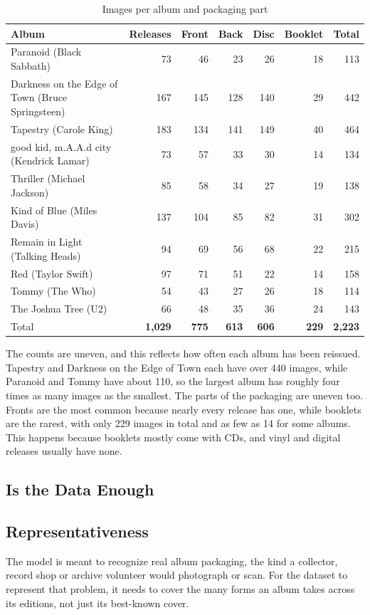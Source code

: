 \documentclass[10pt,a4paper,twocolumn]{article}
\begin{document}
\begin{table}[!t]\centering\small\caption{Images per album and packaging part}\label{tab:counts}
\begin{tabularx}{\linewidth}{@{}Xrrrrrr@{}}\toprule
Album & Releases & Front & Back & Disc & Booklet & Total\\\midrule
Paranoid (Black Sabbath) & 73 & 46 & 23 & 26 & 18 & 113\\
Darkness on the Edge of Town (Bruce Springsteen) & 167 & 145 & 128 & 140 & 29 & 442\\
Tapestry (Carole King) & 183 & 134 & 141 & 149 & 40 & 464\\
good kid, m.A.A.d city (Kendrick Lamar) & 73 & 57 & 33 & 30 & 14 & 134\\
Thriller (Michael Jackson) & 85 & 58 & 34 & 27 & 19 & 138\\
Kind of Blue (Miles Davis) & 137 & 104 & 85 & 82 & 31 & 302\\
Remain in Light (Talking Heads) & 94 & 69 & 56 & 68 & 22 & 215\\
Red (Taylor Swift) & 97 & 71 & 51 & 22 & 14 & 158\\
Tommy (The Who) & 54 & 43 & 27 & 26 & 18 & 114\\
The Joshua Tree (U2) & 66 & 48 & 35 & 36 & 24 & 143\\\midrule
Total & \textbf{1,029} & \textbf{775} & \textbf{613} & \textbf{606} & \textbf{229} & \textbf{2,223}\\
\bottomrule\end{tabularx}\end{table}

The counts are uneven, and this reflects how often each album has been reissued. Tapestry and Darkness on the Edge of Town each have over 440 images, while Paranoid and Tommy have about 110, so the largest album has roughly four times as many images as the smallest. The parts of the packaging are uneven too. Fronts are the most common because nearly every release has one, while booklets are the rarest, with only 229 images in total and as few as 14 for some albums. This happens because booklets mostly come with CDs, and vinyl and digital releases usually have none.

\subsection{Is the Data Enough}

\subsection{Representativeness}
The model is meant to recognize real album packaging, the kind a collector, record shop or archive volunteer would photograph or scan. For the dataset to represent that problem, it needs to cover the many forms an album takes across its editions, not just its best-known cover.
\end{document}
